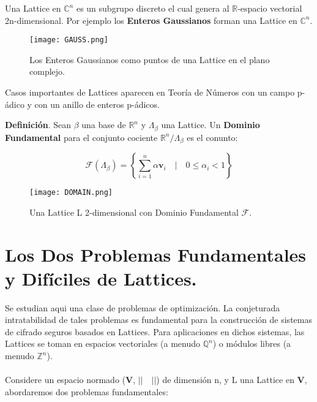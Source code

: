 \documentclass[11pt]{article}
\begin{document}
\begin{abstact}
Una Lattice en $\mathbb{C}^{n}$ es un subgrupo discreto el cual genera al $\mathbb{R}$-espacio vectorial 2n-dimensional. Por ejemplo los \textbf{Enteros Gaussianos} forman una Lattice en $\mathbb{C}^{n}$. 

\begin{figure}[h]
\centering
\texttt{[image: GAUSS.png]}
        \caption{Los Enteros Gaussianos como puntos de una Lattice en el plano complejo.}
\end{figure}

\hline
\medskip

Casos importantes de Lattices aparecen en Teoría de Números con un campo p-ádico y con un anillo de enteros p-ádicos. \\

\medskip


\textbf{Definición}. Sean $\beta$ una base de $\mathbb{R}^{n}$ y $\Lambda_{\beta}$ una Lattice. Un \textbf{Dominio Fundamental} para el conjunto cociente $\mathbb{R}^{n}/ \Lambda_{\beta}$ es el conunto: 

\[\mathcal{F}(\Lambda_{\beta}) = \left\{ \sum _{{i=1}}^{{n}}\alpha{\mathbf  {v}}_{i}\quad | \quad 0 \leq \alpha_{i} < 1 \right\} \]

\begin{figure}[h]
\centering
\texttt{[image: DOMAIN.png]}
	\caption{Una Lattice L 2-dimensional con Dominio Fundamental $\mathcal{F}$.}
\end{figure}

\pagebreak 

\section{Los Dos Problemas Fundamentales y Difíciles de Lattices.}

Se estudian aqui una clase de problemas de optimización. La conjeturada intratabilidad de tales problemas es fundamental para la construcción de sistemas de cifrado seguros basados en Lattices. Para aplicaciones en dichos sistemas, las Lattices se toman en espacios vectoriales (a menudo $ \mathbb {Q}^{n}$) o módulos libres (a menudo $\mathbb{Z}^{n}$).
\\
\\
Considere un espacio normado (\textbf{V}, $|| \quad||$) de dimensión n, y L una Lattice en \textbf{V}, abordaremos dos problemas fundamentales: 


\end{abstact}
\end{document}
